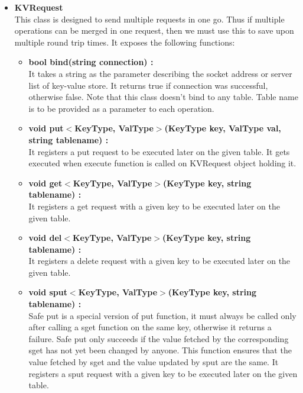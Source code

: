 \documentclass[11pt]{article}
\begin{document}
\begin{itemize}
\item \textbf{KVRequest} \\
This class is designed to send multiple requests in one go. Thus if multiple operations can be merged in one request, then we must use this to save upon multiple round trip times. It exposes the following functions:
\begin{itemize}
\item \textbf{bool bind(string connection) :}\\
It takes a string as the parameter describing the socket address or server list of key-value store. It returns true if connection was successful, otherwise false. Note that this class doesn't bind to any table. Table name is to be provided as a parameter to each operation.\\

\item \textbf{void put$<$KeyType, ValType$>$(KeyType key, ValType val, string tablename) :}\\
It registers a put request to be executed later on the given table. It gets executed when execute function is called on KVRequest object holding it.\\

\item \textbf{void get$<$KeyType, ValType$>$(KeyType key, string tablename) :}\\
It registers a get request with a given key to be executed later on the given table.\\

\item \textbf{void del$<$KeyType, ValType$>$(KeyType key, string tablename) :}\\
It registers a delete request with a given key to be executed later on the given table.\\

\item \textbf{void sput$<$KeyType, ValType$>$(KeyType key, string tablename) :}\\
Safe put is a special version of put function, it must always be called only after calling a sget function on the same key, otherwise it returns a failure. Safe put only succeeds if the value fetched by the corresponding sget has not yet been changed by anyone. This function ensures that the value fetched by sget and the value updated by sput are the same. It registers a sput request with a given key to be executed later on the given table.\\


\end{itemize}
\end{itemize}
\end{document}
